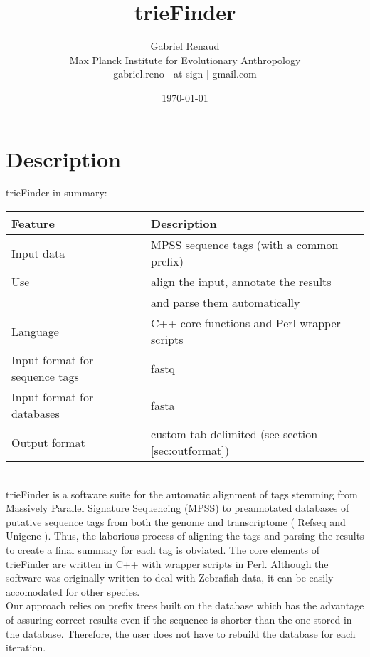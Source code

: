 \documentclass[a4paper,12pt]{article}
\begin{document}
\title{trieFinder}
\author{Gabriel Renaud \\ \footnotesize{ Max Planck Institute for Evolutionary Anthropology} \\ \footnotesize{gabriel.reno [ at sign ] gmail.com}}
\date{\today}
\maketitle

\tableofcontents

\clearpage
\section{Description}


trieFinder in summary: \\

\begin{tabular}{ll}
\hline
Feature & Description \\
\hline
Input data &  MPSS sequence tags (with a common prefix) \\
Use & align the input, annotate the results \\
 & and parse them automatically \\
Language & C++ core functions and Perl wrapper scripts \\
Input format for sequence tags & fastq \\
Input format for databases & fasta \\
Output format  & custom tab delimited (see section \ref{sec:outformat}) \\
\hline
\end{tabular}
\\

trieFinder is a software suite for the automatic alignment of tags stemming from Massively Parallel Signature Sequencing (MPSS) to preannotated databases of putative sequence tags from both the genome and transcriptome ( Refseq and Unigene ). Thus, the laborious process of aligning the tags and parsing the results to create a final summary for each tag is obviated. The core elements of trieFinder are written in C++ with wrapper scripts in Perl. Although the software was originally written to deal with Zebrafish data, it can be easily accomodated for other species.  \\

Our approach relies on prefix trees built on the database which has the advantage of assuring correct results even if the sequence is shorter than the one stored in the database. Therefore, the user does not have to rebuild the database for each iteration. \\
\end{document}
